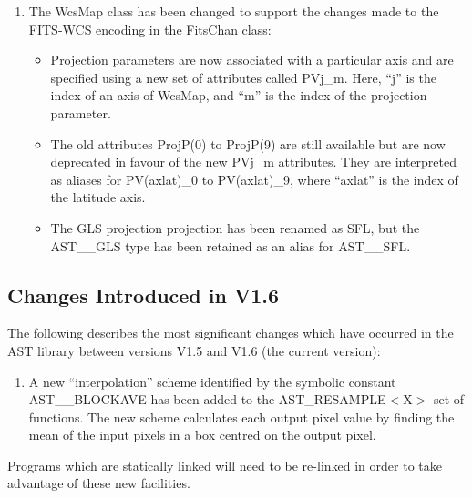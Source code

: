 \documentclass[twoside,11pt]{article}
\newcommand{\htmlref}[2]{#1}
\newcommand{\xlabel}[1]{}
\begin{document}
\begin{enumerate}
\item The \htmlref{WcsMap}{WcsMap} class has been changed to support the changes made to the
FITS-WCS encoding in the FitsChan class:
\begin{itemize}
\item Projection parameters are now associated with a particular axis and
are specified using a new set of attributes called \htmlref{PVj\_m}{PVj_m}. Here, ``j'' is 
the index of an axis of WcsMap, and ``m'' is the index of the projection 
parameter.
\item The old attributes ProjP(0) to ProjP(9) are still available but are
now deprecated in favour of the new PVj\_m attributes. They are interpreted 
as aliases for PV(axlat)\_0 to PV(axlat)\_9, where ``axlat'' is the index of 
the latitude axis.
\item The GLS projection projection has been renamed as SFL, but the 
AST\_\_GLS type has been retained as an alias for AST\_\_SFL.
\end{itemize}

\end{enumerate}

\subsection{\xlabel{changes}\xlabel{list_of_most_recent_changes}Changes
Introduced in V1.6}

The following describes the most significant changes which have
occurred in the AST library between versions V1.5 and V1.6 (the
current version):

\begin{enumerate}

\item A new ``interpolation'' scheme identified by the symbolic constant
AST\_\_BLOCKAVE has been added to the \htmlref{AST\_RESAMPLE$<$X$>$}{AST_RESAMPLEX} set of
functions. The new scheme calculates each output pixel value by finding
the mean of the input pixels in a box centred on the output pixel.

\end{enumerate}

Programs which are statically linked will need to be re-linked in
order to take advantage of these new facilities.
\end{document}
